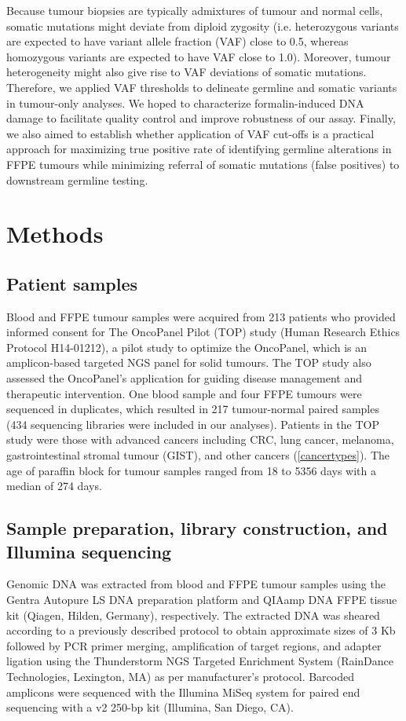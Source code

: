 \documentclass{bmcart}
\begin{document}
Because tumour biopsies are typically admixtures of tumour and normal cells, somatic mutations might deviate from diploid zygosity (i.e. heterozygous variants are expected to have variant allele fraction (VAF) close to 0.5, whereas homozygous variants are expected to have VAF close to 1.0). Moreover, tumour heterogeneity might also give rise to VAF deviations of somatic mutations. Therefore, we applied VAF thresholds to delineate germline and somatic variants in tumour-only analyses. We hoped to characterize formalin-induced DNA damage to facilitate quality control and improve robustness of our assay. Finally, we also aimed to establish whether application of VAF cut-offs is a practical approach for maximizing true positive rate of identifying germline alterations in FFPE tumours while minimizing referral of somatic mutations (false positives) to downstream germline testing.

\section*{Methods}

\subsection*{Patient samples}

Blood and FFPE tumour samples were acquired from 213 patients who provided informed consent for The OncoPanel Pilot (TOP) study (Human Research Ethics Protocol H14­-01212), a pilot study to optimize the OncoPanel, which is an amplicon-based targeted NGS panel for solid tumours. The TOP study also assessed the OncoPanel's application for guiding disease management and therapeutic intervention. One blood sample and four FFPE tumours were sequenced in duplicates, which resulted in 217 tumour-normal paired samples (434 sequencing libraries were included in our analyses). Patients in the TOP study were those with advanced cancers including CRC, lung cancer, melanoma, gastrointestinal stromal tumour (GIST), and other cancers (\autoref{cancertypes}). The age of paraffin block for tumour samples ranged from 18 to 5356 days with a median of 274 days.

\subsection*{Sample preparation, library construction, and Illumina sequencing}
Genomic DNA was extracted from blood and FFPE tumour samples using the Gentra Autopure LS DNA preparation platform and QIAamp DNA FFPE tissue kit (Qiagen, Hilden, Germany), respectively. The extracted DNA was sheared according to a previously described protocol \cite{Bosdet2013} to obtain approximate sizes of 3 Kb followed by PCR primer merging, amplification of target regions, and adapter ligation using the Thunderstorm NGS Targeted Enrichment System (RainDance Technologies, Lexington, MA) as per manufacturer's protocol. Barcoded amplicons were sequenced with the Illumina MiSeq system for paired end sequencing with a v2 250-bp kit (Illumina, San Diego, CA).
\end{document}
